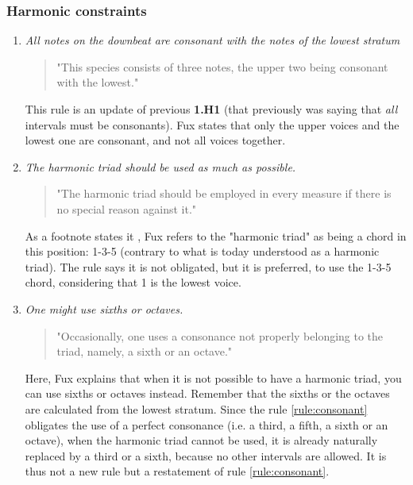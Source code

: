 \subsubsection{Harmonic constraints}
\begin{enumerate}[wide, label=\bfseries 1.H\arabic*]
    \item\label{rule:consonant} \textit{All notes on the downbeat are consonant with the notes of the lowest stratum}
     
    \begin{quotation}
       "This species consists of three notes, the upper two being consonant with the lowest."
       \textcite[p.71]{GaPEng}
   \end{quotation}

   This rule is an update of previous \textbf{1.H1} (that previously was saying that \textit{all} intervals must be consonants). Fux states that only the upper voices and the lowest one are consonant, and not all voices together. 
    
    \setcounter{enumi}{7} %

    \item\label{rule:harmonic-triad} \reddot \textit{The harmonic triad should be used as much as possible.}

    \begin{quotation}
    "The harmonic triad should be employed in every measure if there is no special reason against it."
    \textcite[p.71]{GaPEng}
    \end{quotation}

    As a footnote states it \cite[footnote, p.71]{GaPEng}, Fux refers to the "harmonic triad" as being a chord in this position: 1-3-5 (contrary to what is today understood as a harmonic triad).
    The rule says it is not obligated, but it is preferred, to use the 1-3-5 chord, considering that 1 is the lowest voice.
    

    \item\label{rule:sixth-or-octaves} \reddot \textit{One might use sixths or octaves.}

    \begin{quotation}
    "Occasionally, one uses a consonance not properly belonging to the triad, namely, a sixth or an octave."
    \textcite[p.72]{GaPEng}
    \end{quotation}

    Here, Fux explains that when it is not possible to have a harmonic triad, you can use sixths or octaves instead. Remember that the sixths or the octaves are calculated from the lowest stratum. Since the rule \ref{rule:consonant} obligates the use of a perfect consonance (i.e. a third, a fifth, a sixth or an octave), when the harmonic triad cannot be used, it is already naturally replaced by a third or a sixth, because no other intervals are allowed. It is thus not a new rule but a restatement of rule \ref{rule:consonant}.    


\end{enumerate}
